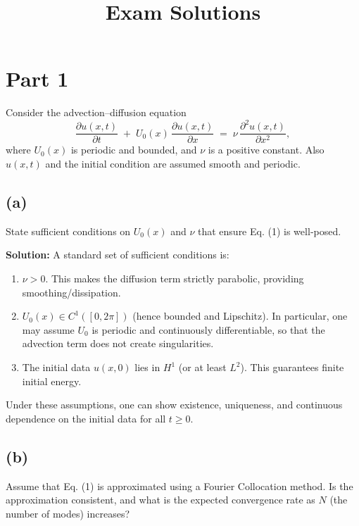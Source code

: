 \documentclass{article}
\title{Exam Solutions}
\author{}
\date{}
\begin{document}

\maketitle

\section*{Part 1}
Consider the advection–diffusion equation
\[
    \frac{\partial u(x, t)}{\partial t} \;+\; U_0(x)\,\frac{\partial u(x, t)}{\partial x}
    \;=\; \nu\,\frac{\partial^2 u(x, t)}{\partial x^2},
\]
where $U_0(x)$ is periodic and bounded, and $\nu$ is a positive constant. Also $u(x, t)$ and the initial condition are assumed smooth and periodic.

\subsection*{(a)}
State sufficient conditions on $U_0(x)$ and $\nu$ that ensure Eq. (1) is well‐posed.

\textbf{Solution:}
A standard set of sufficient conditions is:
\begin{enumerate}
    \item $\displaystyle \nu > 0$.  This makes the diffusion term strictly parabolic, providing smoothing/dissipation.
    \item $\displaystyle U_0(x)\in C^1([0,2\pi])$ (hence bounded and Lipschitz).  In particular, one may assume $U_0$ is periodic and continuously differentiable, so that the advection term does not create singularities.
    \item The initial data $u(x,0)$ lies in $H^1$ (or at least $L^2$).  This guarantees finite initial energy.
\end{enumerate}
Under these assumptions, one can show existence, uniqueness, and continuous dependence on the initial data for all $t\ge0$.

\subsection*{(b)}
Assume that Eq. (1) is approximated using a Fourier Collocation method. Is the approximation consistent, and what is the expected convergence rate as $N$ (the number of modes) increases?
\end{document}
